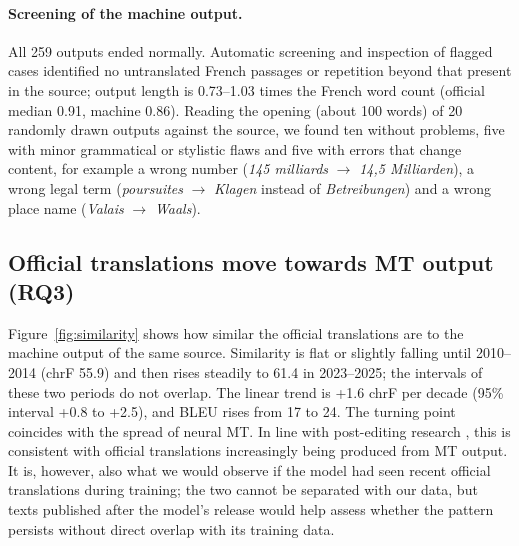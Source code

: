 \documentclass[11pt,a4paper]{article}
\begin{document}
\paragraph{Screening of the machine output.} All 259 outputs ended normally. Automatic screening and inspection of flagged cases identified no untranslated French passages or repetition beyond that present in the source; output length is 0.73--1.03 times the French word count (official median 0.91, machine
0.86). Reading the opening (about 100 words) of 20 randomly drawn outputs against the
source, we found ten without problems, five with minor grammatical or stylistic
flaws and five with errors that change content, for example a wrong number
(\emph{145 milliards} $\rightarrow$ \emph{14,5 Milliarden}), a wrong legal term
(\emph{poursuites} $\rightarrow$ \emph{Klagen} instead of \emph{Betreibungen})
and a wrong place name (\emph{Valais} $\rightarrow$ \emph{Waals}).

\subsection{Official translations move towards MT output (RQ3)}

Figure~\ref{fig:similarity} shows how similar the official translations are to
the machine output of the same source. Similarity is flat or slightly falling
until 2010--2014 (chrF 55.9) and then rises steadily to 61.4 in 2023--2025; the
intervals of these two periods do not overlap. The linear trend is +1.6 chrF per
decade (95\% interval +0.8 to +2.5), and BLEU rises from 17 to 24. The turning
point coincides with the spread of neural MT. In line with post-editing research \citep{toral2019}, this is consistent with official
translations increasingly being produced from MT output. It is, however, also
what we would observe if the model had seen recent official translations during training; the two cannot be separated with our data, but texts published after the model's release would help assess whether the pattern persists without direct overlap with its training data.
\end{document}
